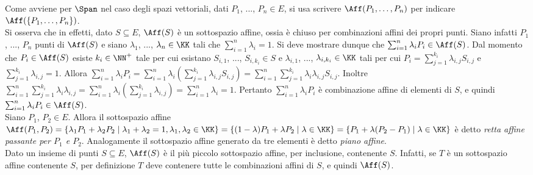\documentclass[11pt]{article}
\begin{document}
	\begin{remark}\nl
		\li Come avviene per $\Span$ nel caso degli spazi vettoriali, dati $P_1$, ..., $P_n \in E$, si usa scrivere $\Aff(P_1, \ldots, P_n)$
		per indicare $\Aff(\{P_1, \ldots, P_n\})$. \\
		
		\li Si osserva che in effetti, dato $S \subseteq E$, $\Aff(S)$ è un sottospazio affine, ossia è
		chiuso per combinazioni affini dei propri punti. Siano infatti $P_1$, ..., $P_n$ punti di $\Aff(S)$
		e siano $\lambda_1$, ..., $\lambda_n \in \KK$ tali che $\sum_{i=1}^n \lambda_i = 1$. Si deve
		mostrare dunque che $\sum_{i=1}^n \lambda_i P_i \in \Aff(S)$. Dal momento che $P_i \in \Aff(S)$ esiste $k_i \in \NN^+$ tale per cui esistano
		$S_{i,1}$, ..., $S_{i,k_i} \in S$ e $\lambda_{i,1}$, ..., $\lambda_{i,k_i} \in \KK$ tali per cui
		$P_i = \sum_{j=1}^{k_i} \lambda_{i,j} S_{i,j}$ e $\sum_{j=1}^{k_i} \lambda_{i,j} = 1$. Allora
		$\sum_{i=1}^n \lambda_i P_i = \sum_{i=1}^n \lambda_i (\sum_{j=1}^{k_i} \lambda_{i,j} S_{i,j}) =
		\sum_{i=1}^n \sum_{j=1}^{k_i} \lambda_i \lambda_{i,j} S_{i,j}$. Inoltre $\sum_{i=1}^n \sum_{j=1}^{k_i} \lambda_i \lambda_{i,j} = \sum_{i=1}^n \lambda_i (\sum_{j=1}^{k_i}  \lambda_{i,j}) = \sum_{i=1}^n \lambda_i = 1$.
		Pertanto $\sum_{i=1}^n \lambda_i P_i$ è combinazione affine di elementi di $S$, e quindi $\sum_{i=1}^n \lambda_i P_i \in \Aff(S)$. \\
		
		\li Siano $P_1$, $P_2 \in E$. Allora il sottospazio affine $\Aff(P_1, P_2) = \{ \lambda_1 P_1 + \lambda_2 P_2 \mid \lambda_1 + \lambda_2 = 1, \lambda_1, \lambda_2 \in \KK \} = \{ (1-\lambda) P_1 + \lambda P_2 \mid \lambda \in \KK \} = \{ P_1 + \lambda (P_2 - P_1) \mid \lambda \in \KK \}$ è detto \textit{retta affine passante per $P_1$ e $P_2$}. Analogamente il sottospazio affine generato da tre elementi è detto \textit{piano affine}. \\
		
		\li Dato un insieme di punti $S \subseteq E$, $\Aff(S)$ è il più piccolo sottospazio affine, per inclusione,
		contenente $S$. Infatti, se $T$ è un sottospazio affine contenente $S$, per definizione $T$ deve
		contenere tutte le combinazioni affini di $S$, e quindi $\Aff(S)$.
	\end{remark}
\end{document}
